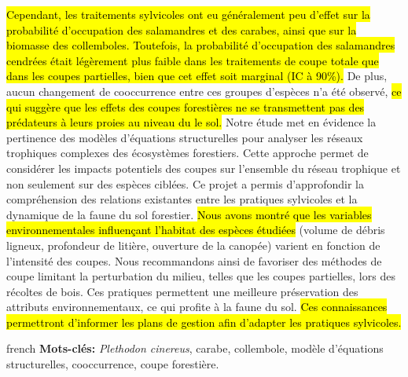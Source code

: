 \hl{Cependant, les traitements sylvicoles ont eu généralement peu d’effet sur la probabilité d’occupation des salamandres et des carabes, ainsi que sur la biomasse des collemboles. 
Toutefois, la probabilité d’occupation des salamandres cendrées était légèrement plus faible dans les traitements de coupe totale que dans les coupes partielles, bien que cet effet soit marginal (IC à 90\%).}
De plus, aucun changement de cooccurrence entre ces groupes d’espèces n’a été observé, \hl{ce qui suggère que les effets des coupes forestières ne se transmettent pas des prédateurs à leurs proies au niveau du le sol. }
Notre étude met en évidence la pertinence des modèles d’équations structurelles pour analyser les réseaux trophiques complexes des écosystèmes forestiers. 
Cette approche permet de considérer les impacts potentiels des coupes sur l’ensemble du réseau trophique et non seulement sur des espèces ciblées. 
Ce projet a permis d’approfondir la compréhension des relations existantes entre les pratiques sylvicoles et la dynamique de la faune du sol forestier. 
\hl{Nous avons montré que les variables environnementales influençant l’habitat des espèces étudiées} (volume de débris ligneux, profondeur de litière, ouverture de la canopée) varient en fonction de l’intensité des coupes. 
Nous recommandons ainsi de favoriser des méthodes de coupe limitant la perturbation du milieu, telles que les coupes partielles, lors des récoltes de bois. 
Ces pratiques permettent une meilleure préservation des attributs environnementaux, ce qui profite à la faune du sol. 
\hl{Ces connaissances permettront d’informer les plans de gestion afin d’adapter les pratiques sylvicoles.}


\begin{otherlanguage*}{french}
\textbf{Mots-clés:} \textit{Plethodon cinereus}, carabe, collembole, modèle d'équations structurelles, cooccurrence, coupe forestière.
\end{otherlanguage*}
